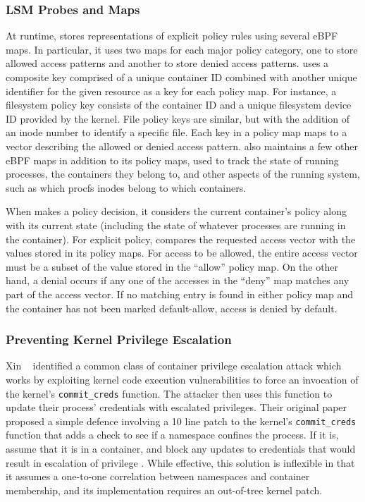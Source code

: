 \subsubsection{LSM Probes and Maps}

At runtime, \bpfcontain{} stores representations of explicit policy rules using several eBPF maps. In particular, it uses two maps for each major policy category, one to store allowed access patterns and another to store denied access patterns. \bpfcontain{} uses a composite key comprised of a unique container ID combined with another unique identifier for the given resource as a key for each policy map. For instance, a filesystem policy key consists of the container ID and a unique filesystem device ID provided by the kernel. File policy keys are similar, but with the addition of an inode number to identify a specific file. Each key in a policy map maps to a vector describing the allowed or denied access pattern. \bpfcontain{} also maintains a few other eBPF maps in addition to its policy maps, used to track the state of running processes, the containers they belong to, and other aspects of the running system, such as which procfs inodes belong to which containers.

When \bpfcontain{} makes a policy decision, it considers the current container's policy along with its current state (including the state of whatever processes are running in the container). For explicit policy, \bpfcontain{} compares the requested access vector with the values stored in its policy maps. For access to be allowed, the entire access vector must be a subset of the value stored in the \enquote{allow} policy map. On the other hand, a denial occurs if any one of the accesses in the \enquote{deny} map matches any part of the access vector. If no matching entry is found in either policy map and the container has not been marked default-allow, access is denied by default.

\subsubsection{Preventing Kernel Privilege Escalation}

Xin \etal~\cite{xin2018_container_security} identified a common class of container privilege escalation attack which works by exploiting kernel code execution vulnerabilities to force an invocation of the kernel's \texttt{commit\_creds} function. The attacker then uses this function to update their process' credentials with escalated privileges. Their original paper proposed a simple defence involving a 10 line patch to the kernel's \texttt{commit\_creds} function that adds a check to see if a namespace confines the process. If it is, assume that it is in a container, and block any updates to credentials that would result in escalation of privilege \cite{xin2018_container_security}. While effective, this solution is inflexible in that it assumes a one-to-one correlation between namespaces and container membership, and its implementation requires an out-of-tree kernel patch.


